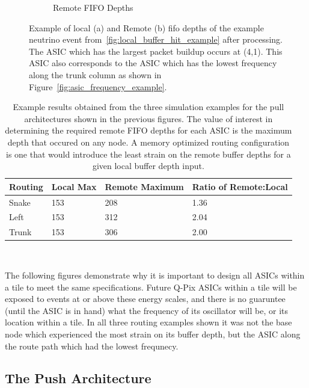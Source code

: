 \begin{figure}
\begin{subfigure}{.5\textwidth}
  \caption{Remote FIFO Depths}
\end{subfigure}
\caption{Example of local (a) and Remote (b) fifo depths of the example neutrino event from~\ref{fig:local_buffer_hit_example} after processing.
The ASIC which has the largest packet buildup occurs at (4,1).
This ASIC also corresponds to the ASIC which has the lowest frequency along the trunk column as shown in Figure~\ref{fig:asic_frequency_example}.
}
\label{fig:trunk_example_neutrino}
\end{figure}


\begin{table}
\begin{center}
\begin{tabular}{|| p{20mm} | p{40mm} | p{40mm} | p{45mm} ||}
 \hline
 Routing & Local Max & Remote Maximum & Ratio of Remote:Local \\ [0.5ex]
 \hline\hline
  Snake & 153 & 208 & 1.36 \\
 \hline
  Left & 153 & 312 & 2.04 \\
 \hline
  Trunk & 153 & 306 & 2.00 \\
 \hline
 \hline
\end{tabular}
\caption{Example results obtained from the three simulation examples for the pull architectures shown in the previous figures.
The value of interest in determining the required remote FIFO depths for each ASIC is the maximum depth that occured on any node.
A memory optimized routing configuration is one that would introduce the least strain on the remote buffer depths for a given local buffer depth input.
}
\end{center}
\end{table}
~\label{table:example_analysis}

The following figures demonstrate why it is important to design all ASICs within a tile to meet the same specifications.
Future Q-Pix ASICs within a tile will be exposed to events at or above these energy scales, and there is no guaruntee (until the ASIC is in hand) what the frequency of its oscillator will be, or its location within a tile. 
In all three routing examples shown it was not the base node which experienced the most strain on its buffer depth, but the ASIC along the route path which had the lowest frequnecy.


\subsection{The Push Architecture}

